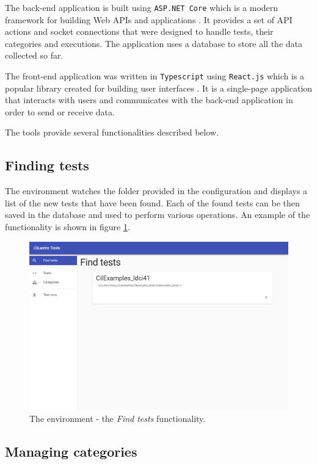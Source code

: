 \documentclass[declaration,shortabstract,english,mgr]{iithesis}
\begin{document}
The back-end application is built using \texttt{ASP.NET Core} which is a modern framework for building Web APIs and applications \cite{littleAsp}. It provides a set of API actions and socket connections that were designed to handle tests, their categories and executions. The application uses a database to store all the data collected so far.

The front-end application was written in \texttt{Typescript} using \texttt{React.js} which is a popular library created for building user interfaces \cite{learningReact}. It is a single-page application that interacts with users and communicates with the back-end application in order to send or receive data.

The tools provide several functionalities described below.

\subsection{Finding tests}

The environment watches the folder provided in the configuration and displays a list of the new tests that have been found. Each of the found tests can be then saved in the database and used to perform various operations. An example of the functionality is shown in figure \ref{fig:tools_find}.

\begin{figure}
	\includegraphics[width=1\textwidth]{tools_find.png}
    \centering
    \caption{The environment - the \textit{Find tests} functionality.}
    \label{fig:tools_find}
\end{figure}

\subsection{Managing categories}
\end{document}
